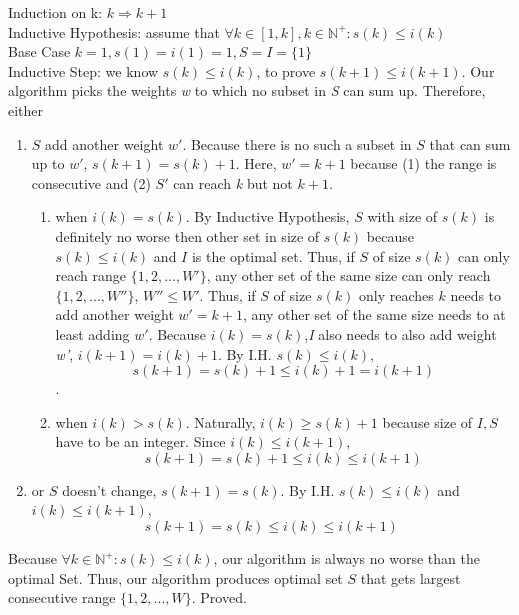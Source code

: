 \documentclass{article}
\begin{document}
            Induction on k: $k\Rightarrow k+1$\\
             Inductive Hypothesis: assume that $\forall k\in [1,k], k\in \mathbb{N}^{+}: s(k)\leq i(k)$\\
            Base Case $k = 1, s(1)=i(1)=1, S=I=\{1\}$\\
            Inductive Step: we know $s(k)\leq i(k)$, to prove $s(k+1)\leq i(k+1)$. Our algorithm picks the weights \textit{w} to which no subset in \textit{S} can sum up. Therefore, either \begin{enumerate}
                \item $S$ add another weight $w'$. Because there is no such a subset in $S$ that can sum up to $w'$, $s(k+1) = s(k) + 1$. Here, $w' = k+1$ because (1) the range is consecutive and (2) $S'$ can reach \textit{k} but not $k+1$.
                \begin{enumerate}
                    \item when $i(k) = s(k)$.  By Inductive Hypothesis, $S$ with size of $s(k)$ is definitely no worse then other set in size of $s(k)$ because $s(k)\leq i(k)$ and $I$ is the optimal set. Thus, if $S$ of size $s(k)$ can only reach range $\{1,2,...,W'\}$, any other set of the same size can only reach $\{1,2,...,W''\}$, $W''\leq W'$.
                    Thus, if $S$ of size $s(k)$ only reaches $k$ needs to add another weight $w'=k+1$, any other set of the same size needs to at least adding $w'$. Because $i(k)=s(k)$,\textit{I} also needs to also add weight \textit{w'}, $i(k+1) = i(k)+1$. By I.H. $s(k)\leq i(k)$, 
                    \[s(k+1)=s(k)+1\leq i(k)+1=i(k+1)\].
                    
                    \item when $i(k) > s(k)$. Naturally, $i(k) \geq s(k) + 1$ because size of $I, S$ have to be an integer. Since $i(k) \leq i(k+1)$, \[s(k+1)=s(k)+1\leq i(k)\leq i(k+1)\]
                    
                \end{enumerate}
                \item or $S$ doesn't change, $s(k+1) = s(k)$. By I.H. $s(k)\leq i(k)$ and $i(k)\leq i(k+1)$, \[s(k+1) = s(k) \leq i(k) \leq i(k+1)\]
            \end{enumerate}
            Because $\forall k\in \mathbb{N}^{+}: s(k)\leq i(k) $, our algorithm is always no worse than the optimal Set. Thus, our algorithm produces optimal set $S$ that gets largest consecutive range $\{1,2,...,W\}$. Proved.
\end{document}
